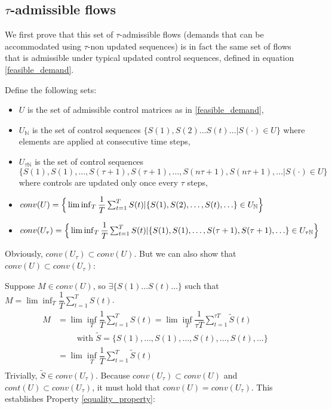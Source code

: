 \subsection*{$\tau$-admissible flows}
We first prove that this set of $\tau$-admissible flows (demands that can be accommodated using $\tau$-non updated sequences) is in fact the same set of flows that is admissible under typical updated control sequences, defined in equation \eqref{feasible_demand}. 

\noindent Define the following sets:
\begin{itemize}
\item $U$ is the set of admissible control matrices as in \eqref{feasible_demand},
\item $U_{\mathbb{N}}$ is the set of control sequences $\{S(1), S(2) \ldots S(t) \ldots |  S(\cdot) \in U\} $ where elements are applied at consecutive time steps,
\item $U_{\tau\mathbb{N}}$ is the set of control sequences $\{S(1), S(1), \ldots ,  S(\tau + 1),S(\tau + 1), \ldots , S(n\tau + 1),S(n\tau + 1), \ldots |  S(\cdot) \in U\} $ where controls are updated only once every $\tau$ steps,
\item $conv(U) = \Big\{\lim\inf_{T} \dfrac{1}{T}\sum_{t=1}^{T} S(t) | \{S(1), S(2), \ldots , \\ S(t), \ldots \}\in U_{\mathbb{N}} \Big\} $ 
\item $conv(U_\tau ) = \Big\{\lim\inf_{T} \dfrac{1}{T}\sum_{t=1}^{T} S(t) | \{S(1), S(1), \ldots, \\ S(\tau + 1),S(\tau + 1), \ldots\}\in U_{\tau\mathbb{N}} \Big\} $ 
\end{itemize}
Obviously, $conv(U_{\tau}) \subset conv(U)$. But we can also show that $conv(U) \subset conv(U_{\tau})$:  

\noindent Suppose $M \in conv(U)$, so $\exists \{ S(1) \ldots S(t) \ldots \}$ such that $M = \lim\inf_{T} \dfrac{1}{T}\sum_{t=1}^{T} S(t)$.
\begin{align*}
M &= \lim\inf_{T} \dfrac{1}{T}\sum_{t=1}^{T} S(t)= \lim\inf_{T} \dfrac{1}{\tau T}\sum_{t=1}^{\tau T}  \tilde{S}(t) \; \\ 
& \qquad \text{ with } \tilde{S} = \{S(1), \ldots, S(1), \ldots, S(t), \ldots, S(t), \ldots \} \\
&= \lim\inf_{T} \dfrac{1}{ T}\sum_{t=1}^{T}  \tilde{S}(t) \\
\end{align*}
Trivially, $\tilde{S }\in conv(U_\tau)$. Because $conv(U_{\tau})\subset conv(U)$ and $cont(U) \subset conv(U_{\tau})$, it must hold that $conv(U) = conv(U_{\tau})$.  This establishes Property \ref{equality_property}: 

